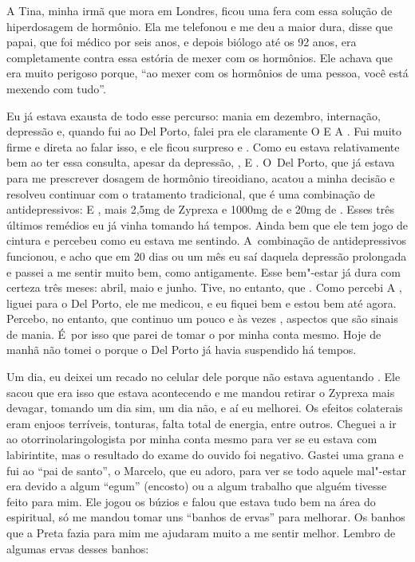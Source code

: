 A Tina, minha irmã que mora em Londres, ficou uma fera com essa solução
de hiperdosagem de hormônio. Ela me telefonou e me deu a maior dura,
disse que papai, que foi médico por seis anos, e depois biólogo até os
92 anos, era completamente contra essa estória de mexer com os
hormônios. Ele achava que era muito perigoso porque, ``ao mexer com os
hormônios de uma pessoa, você está mexendo com tudo''.

Eu já estava exausta de todo esse percurso: mania em dezembro,
internação, depressão e, quando fui ao Del Porto, falei pra ele
claramente         O   E 
A  . Fui muito firme e direta ao falar isso, e ele ficou
surpreso e . Como eu estava relativamente bem ao ter essa
consulta, apesar da depressão,     ,  E
. O~Del Porto, que já estava para me prescrever dosagem de
hormônio tireoidiano, acatou a minha decisão e resolveu continuar com o
tratamento tradicional, que é uma combinação de antidepressivos: 
E , mais 2,5mg de Zyprexa e 1000mg de  e 20mg de
. Esses três últimos remédios eu já vinha tomando há tempos.
Ainda bem que ele tem jogo de cintura e percebeu como eu estava me
sentindo. A~combinação de antidepressivos funcionou, e acho que em 20
dias ou um mês eu saí daquela depressão prolongada e passei a me sentir
muito bem, como antigamente. Esse bem"-estar já dura com certeza três
meses: abril, maio e junho. Tive, no entanto, que   
    . Como percebi A , liguei para o Del
Porto, ele me medicou, e eu fiquei bem e estou bem até agora. Percebo,
no entanto, que continuo um pouco  e às vezes ,
aspectos que são sinais de mania. É~por isso que parei de tomar o
 por minha conta mesmo. Hoje de manhã não tomei o 
porque o Del Porto já havia suspendido há tempos.

Um dia, eu deixei um recado  no celular dele porque não
estava aguentando       . Ele
sacou que era isso que estava acontecendo e me mandou retirar o Zyprexa
mais devagar, tomando um dia sim, um dia não, e aí eu melhorei. Os
efeitos colaterais eram enjoos terríveis, tonturas, falta total de
energia, entre outros. Cheguei a ir ao otorrinolaringologista por minha
conta mesmo para ver se eu estava com labirintite, mas o resultado do
exame do ouvido foi negativo. Gastei uma grana e fui ao ``pai de
santo'', o Marcelo, que eu adoro, para ver se todo aquele mal"-estar era
devido a algum ``egum'' (encosto) ou a algum trabalho que alguém tivesse
feito para mim. Ele jogou os búzios e falou que estava tudo bem na área
do espiritual, só me mandou tomar uns ``banhos de ervas'' para melhorar.
Os banhos que a Preta fazia para mim me ajudaram muito a me sentir
melhor. Lembro de algumas ervas desses banhos:

